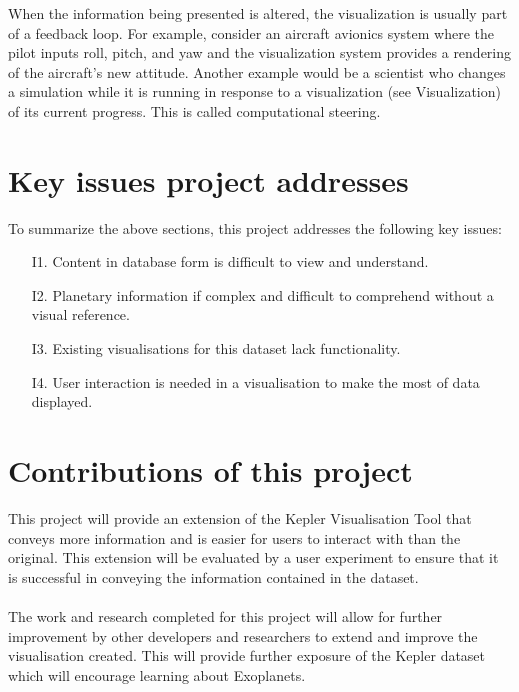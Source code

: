 When the information being presented is altered, the visualization is usually part of a feedback loop. For example, consider an aircraft avionics system where the pilot inputs roll, pitch, and yaw and the visualization system provides a rendering of the aircraft's new attitude. Another example would be a scientist who changes a simulation while it is running in response to a visualization (see Visualization) of its current progress. This is called computational steering.

\section{Key issues project addresses}
To summarize the above sections, this project addresses the following key issues:
\begin{enumerate}
 \item[I1.] Content in database form is difficult to view and understand.
 \item[I2.] Planetary information if complex and difficult to comprehend without a visual reference.
 \item[I3.] Existing visualisations for this dataset lack functionality.
 \item[I4.] User interaction is needed in a visualisation to make the most of data displayed.
\end{enumerate}

\section{Contributions of this project}
This project will provide an extension of the Kepler Visualisation Tool \cite{kepler_github} that conveys more information and is easier for users to interact with than the original. This extension will be evaluated by a user experiment to ensure that it is successful in conveying the information contained in the dataset.
\\\\
The work and research completed for this project will allow for further improvement by other developers and researchers to extend and improve the visualisation created. This will provide further exposure of the Kepler dataset which will encourage learning about Exoplanets.
